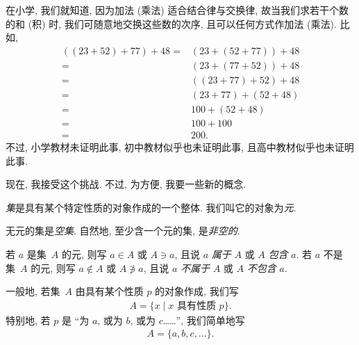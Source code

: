 \documentclass[../libro.tex]{subfiles}
\begin{document}

在小学, 我们就知道, 因为加法 (乘法)
适合结合律与交换律,
故当我们求若干个数的和 (积) 时,
我们可随意地交换这些数的次序,
且可以任何方式作加法 (乘法).
比如,
\begin{align*}
    ((23 + 52) + 77) + 48
    = {} & (23 + (52 + 77)) + 48 \\
    = {} & (23 + (77 + 52)) + 48 \\
    = {} & ((23 + 77) + 52) + 48 \\
    = {} & (23 + 77) + (52 + 48) \\
    = {} & 100 + (52 + 48)       \\
    = {} & 100 + 100             \\
    = {} & 200.
\end{align*}
不过, 小学教材未证明此事,
初中教材似乎也未证明此事,
且高中教材似乎也未证明此事.

现在, 我接受这个挑战.
不过, 为方便, 我要一些新的概念.

\begin{definition}
    \emph{集}是具有某个特定性质的对象作成的一个整体.
    我们叫它的对象为\emph{元}.

    无元的集是\emph{空集}.
    自然地, 至少含一个元的集, 是\emph{非空的}.

    若 \(a\) 是集~\(A\) 的元,
    则写 \(a \in A\) 或 \(A \ni a\),
    且说 \(a\) \emph{属于} \(A\)
    或 \(A\) \emph{包含} \(a\).
    若 \(a\) 不是集~\(A\) 的元,
    则写 \(a \notin A\) 或 \(A \not\ni a\),
    且说 \(a\) \emph{不属于} \(A\)
    或 \(A\) \emph{不包含} \(a\).

    一般地, 若集~\(A\) 由具有某个性质 \(p\) 的对象作成,
    我们写
    \begin{align*}
        A = \{ x \mid \text{\(x\) 具有性质 \(p\)} \}.
    \end{align*}
    特别地, 若 \(p\) 是
    ``为 \(a\), 或为 \(b\), 或为 \(c\)……'',
    我们简单地写
    \begin{align*}
        A = \{ a,b,c,\dots \}.
    \end{align*}
\end{definition}
\end{document}
